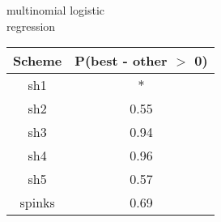 \begin{subtable}[b]{0.3\linewidth}
  \caption{multinomial logistic\\regression}
  \centering
  \begin{tabular}{ c c }
    \hline
    Scheme & P(best - other \(>\) 0) \\ 
    \hline
    \hline
    sh1 & \(\ast\) \\ 
    sh2 & 0.55 \\ 
    sh3 & 0.94 \\ 
    sh4 & 0.96 \\ 
    sh5 & 0.57 \\ 
    spinks & 0.69 \\ 
    \hline
  \end{tabular}
  \label{mmdif}
\end{subtable}
